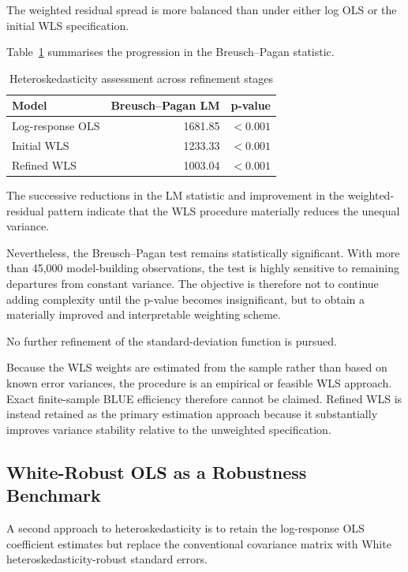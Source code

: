 \documentclass[11pt,a4paper]{article}
\begin{document}
The weighted residual spread is more balanced than under either log OLS or the initial WLS specification.

Table~\ref{tab:refinement-bp} summarises the progression in the Breusch--Pagan statistic.

\begin{table}[H]
\centering
\caption{Heteroskedasticity assessment across refinement stages}
\label{tab:refinement-bp}
\begin{tabular}{lrr}
\toprule
\textbf{Model} & \textbf{Breusch--Pagan LM} & \textbf{p-value} \\
\midrule
Log-response OLS & 1681.85 & $<0.001$ \\
Initial WLS & 1233.33 & $<0.001$ \\
Refined WLS & 1003.04 & $<0.001$ \\
\bottomrule
\end{tabular}
\end{table}

The successive reductions in the LM statistic and improvement in the weighted-residual pattern indicate that the WLS procedure materially reduces the unequal variance.

Nevertheless, the Breusch--Pagan test remains statistically significant. With more than 45,000 model-building observations, the test is highly sensitive to remaining departures from constant variance. The objective is therefore not to continue adding complexity until the p-value becomes insignificant, but to obtain a materially improved and interpretable weighting scheme.

No further refinement of the standard-deviation function is pursued.

Because the WLS weights are estimated from the sample rather than based on known error variances, the procedure is an empirical or feasible WLS approach. Exact finite-sample BLUE efficiency therefore cannot be claimed. Refined WLS is instead retained as the primary estimation approach because it substantially improves variance stability relative to the unweighted specification.

\subsection{White-Robust OLS as a Robustness Benchmark}

A second approach to heteroskedasticity is to retain the log-response OLS coefficient estimates but replace the conventional covariance matrix with White heteroskedasticity-robust standard errors.
\end{document}
